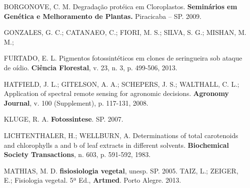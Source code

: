 \documentclass[article,12pt,onesidea,4paper,english,brazil]{abntex2}
\begin{document}
\noindent BORGONOVE, C. M. Degradação protéica em Cloroplastos. \textbf{Seminários em Genética e Melhoramento de Plantas.} Piracicaba – SP. 2009. 

\noindent GONZALES, G. C.; CATANAEO, C.; FIORI, M. S.; SILVA, S. G.; MISHAN, M. M.; 

\noindent FURTADO, E. L. Pigmentos fotossintéticos em clones de seringueira sob ataque de oídio. \textbf {Ciência Florestal}, v. 23, n. 3, p. 499-506, 2013. 

\noindent HATFIELD, J. L.; GITELSON, A. A.; SCHEPERS, J. S.; WALTHALL, C. L.; 
Application of spectral remote sensing for agronomic decisions. \textbf {Agronomy Journal}, v. 100 (Supplement), p. 117-131, 2008. 

KLUGE, R. A. \textbf {Fotossintese}. SP. 2007. 

\noindent LICHTENTHALER, H.; WELLBURN, A. Determinations of total carotenoids and chlorophylls a and b of leaf extracts in different solvents. \textbf {Biochemical Society Transactions}, n. 603, p. 591-592, 1983. 

\noindent MATHIAS, M. D. \textbf {fisiosiologia vegetal}, unesp. SP. 2005. 
\noindent TAIZ, L.; ZEIGER, E.; Fisiologia vegetal. 5ª Ed., \textbf {Artmed}. Porto Alegre. 2013.

	
\end{document}
